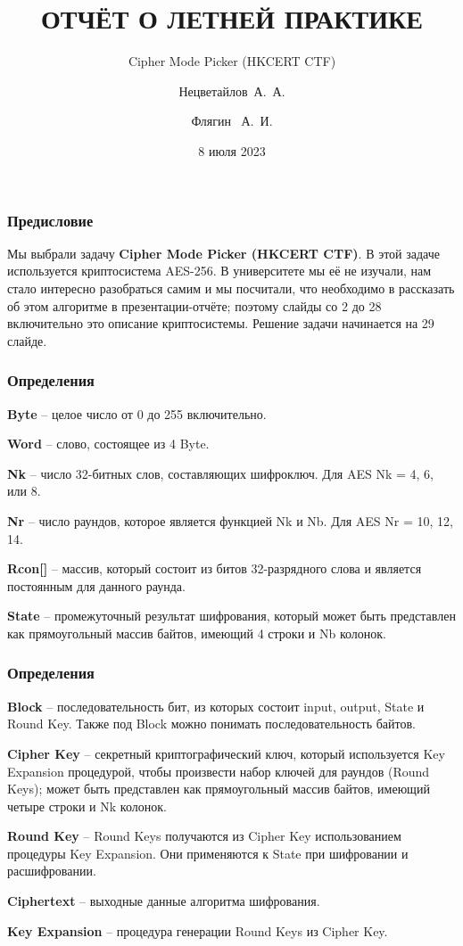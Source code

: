 \documentclass[10pt, typeface=serif(roman), pdf,hyperref={unicode}, aspectratio=169]{beamer}
\institute[VFU] %
{
	«БАЛТИЙСКИЙ ФЕДЕРАЛЬНЫЙ УНИВЕРСИТЕТ ИМЕНИ ИММАНУИЛА КАНТА»
	\and
	Образовательно-научный кластер «Институт высоких технологий»
	\and
	Компьютерная безопасность математические методы защитый информации \\ 3 курс
}
\title{ОТЧЁТ О ЛЕТНЕЙ ПРАКТИКЕ}
\subtitle {Cipher Mode Picker (HKCERT CTF)}
\author[Arthur, Doe] %
{Нецветайлов~А.~А.\and Флягин ~А.~И.}
\date{8 июля 2023}
\begin{document}
\frame{\titlepage}



\begin{frame}
	\frametitle{Предисловие}
	Мы выбрали задачу \textbf{Cipher Mode Picker (HKCERT CTF)}. В этой задаче используется криптосистема AES-256. В университете мы её не изучали, нам стало интересно разобраться самим и мы посчитали, что необходимо в рассказать об этом алгоритме в презентации-отчёте; поэтому слайды со 2 до 28 включительно это описание криптосистемы. Решение задачи начинается на 29 слайде.
\end{frame}



\begin{frame}
	\frametitle{Определения}
	\begin{description}
		\item \textbf{Byte} -- целое число от 0 до 255 включительно.
		\item \textbf{Word} -- слово, состоящее из 4 Byte.
		\item \textbf{Nk} -- число 32-битных слов, составляющих шифроключ. Для AES Nk = 4, 6, или 8.
		\item \textbf{Nr} -- число раундов, которое является функцией Nk и Nb. Для AES Nr = 10, 12, 14.
		\item \textbf{Rcon[]} -- массив, который состоит из битов 32-разрядного слова и является постоянным для данного раунда.
		\item \textbf{State} -- промежуточный результат шифрования, который может быть представлен как прямоугольный массив байтов, имеющий 4 строки и Nb колонок.
	\end{description}
\end{frame}
		


\begin{frame}
	\begin{description}
		\frametitle{Определения}
		\item \textbf{Block} -- последовательность бит, из которых состоит input, output, State и Round Key. Также под Block можно понимать последовательность байтов.
		\item \textbf{Cipher Key} -- секретный криптографический ключ, который используется Key Expansion процедурой, чтобы произвести набор ключей для раундов (Round Keys); может быть представлен как прямоугольный массив байтов, имеющий четыре строки и Nk колонок. %
		\item \textbf{Round Key} -- Round Keys получаются из Cipher Key использованием процедуры Key Expansion. Они применяются к State при шифровании и расшифровании.
		\item \textbf{Ciphertext} -- выходные данные алгоритма шифрования.
		\item \textbf{Key Expansion} -- процедура генерации Round Keys из Cipher Key.
	\end{description}

\end{frame}
\end{document}

